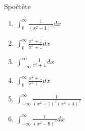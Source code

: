 \begin{multicols}{2}
\separator

Spočtěte
\begin{enumerate}
\item $\int_0^\infty \frac{1}{(x^2 + 1)^3} dx$
\item $\int_0^\infty \frac{x^2 + 1}{x^4 + 1} dx$
\item $\int_{-\infty}^\infty \frac{1}{x^6 + 1} dx$
\item $\int_0^\infty \frac{x^2 + 1}{x^4 + 1} dx$
\item $\int_{-\infty}^\infty \frac{1}{\left( x^2 + 1 \right)^2 \left( x^2 + 4 \right)^2}$
\item $\int_{-\infty}^\infty \frac{1}{(x^2 + 9)^3} dx$
\end{enumerate}

\end{multicols}
